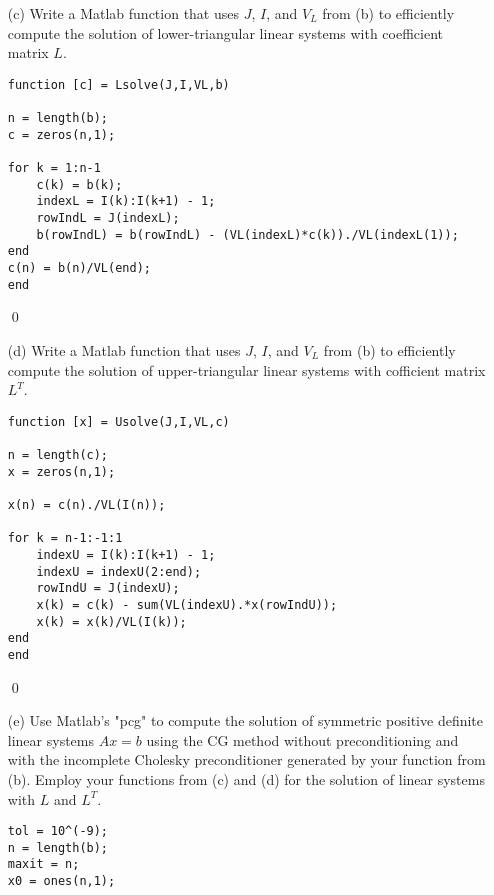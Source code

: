 \documentclass[12pt]{article}
\begin{document}
\begin{itemize}
\item[(c)] Write a Matlab function that uses $J$, $I$, and $V_L$ from (b) to efficiently compute the solution of lower-triangular linear systems with coefficient matrix $L$.\\

\lstset{language=matlab,frame=single}
\begin{lstlisting}[caption= Function to Solve \text{$Lc=b,$} Where L is Lower Triangular]
function [c] = Lsolve(J,I,VL,b)

n = length(b);
c = zeros(n,1);

for k = 1:n-1
    c(k) = b(k);
    indexL = I(k):I(k+1) - 1;
    rowIndL = J(indexL);
    b(rowIndL) = b(rowIndL) - (VL(indexL)*c(k))./VL(indexL(1));
end
c(n) = b(n)/VL(end);
end
\end{lstlisting}
\qed\\

\item[(d)] Write a Matlab function that uses $J$, $I$, and $V_L$ from (b) to efficiently compute the solution of upper-triangular linear systems with cofficient matrix $L^T$.\\

\lstset{language=matlab,frame=single}
\begin{lstlisting}[caption= Function to Solve \text{$L^Tx=c,$} Where \text{$L^T$} is Upper Triangular]
function [x] = Usolve(J,I,VL,c)

n = length(c);
x = zeros(n,1);

x(n) = c(n)./VL(I(n));

for k = n-1:-1:1
    indexU = I(k):I(k+1) - 1;
    indexU = indexU(2:end);
    rowIndU = J(indexU);
    x(k) = c(k) - sum(VL(indexU).*x(rowIndU));
    x(k) = x(k)/VL(I(k));
end
end
\end{lstlisting}
\qed\\

\item[(e)] Use Matlab's "pcg" to compute the solution of symmetric positive definite linear systems $Ax = b$ using the CG method without preconditioning and with the incomplete Cholesky preconditioner generated by your function from (b).  Employ your functions from (c) and (d) for the solution of linear systems with $L$ and $L^T$.

\lstset{language=matlab,frame=single}
\begin{lstlisting}[caption= Compute \text{$Ax=b$} Using PCG With and Without Preconditioning]
tol = 10^(-9);
n = length(b);
maxit = n;
x0 = ones(n,1);


\end{lstlisting}
\end{itemize}
\end{document}
